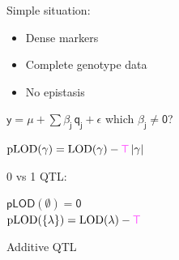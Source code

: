 \documentclass[12pt]{article}
\newcommand{\headsize}{\fontsize{35}{35} \selectfont}
\newcommand{\smallersize}{\fontsize{20}{25} \selectfont}
\newcommand{\smallestsize}{\fontsize{18}{22} \selectfont}
\newcommand{\lod}{\text{LOD}}
\newcommand{\plod}{\text{pLOD}}
\begin{document}
\hfill \begin{minipage}{10in}

Simple situation:

{\smallestsize
\color{myblue}
\begin{itemize}
\item Dense markers
\item Complete genotype data
\item No epistasis

\end{itemize} }

\vspace{2cm}

\centerline{
$\mathsf{y  = \mu + \sum \beta_j \, q_j + \epsilon}$ \hspace{1cm}
       {\color{mypink} which $\mathsf{\beta_j \ne 0}$?}
}

\vspace{2cm}

{\color{myyellow}
$\mathsf{ \plod(\gamma) = \lod(\gamma) -
    {\color{mypink} T} \, |\gamma| }$
}

\vspace{2cm}

\begin{minipage}[t]{1.4in}
\vspace*{0mm}

0 vs 1 QTL: 
\end{minipage}
\begin{minipage}[t]{6in}
\vspace*{0mm} 

\color{myblue}
$\mathsf{\plod(\emptyset) = 0}$ \\[16pt]
$\mathsf{\plod(\{\lambda\}) =
    \lod(\lambda) - {\color{mypink} T}}$ 
\end{minipage}


\end{minipage}



\newpage

\addtocounter{page}{-1}

\headsize \color{myyellow}
\hfill \begin{minipage}{5.75in}
\centering
Additive QTL
\end{minipage}

\vspace{2cm} \color{mywhite} \smallersize
\end{document}
